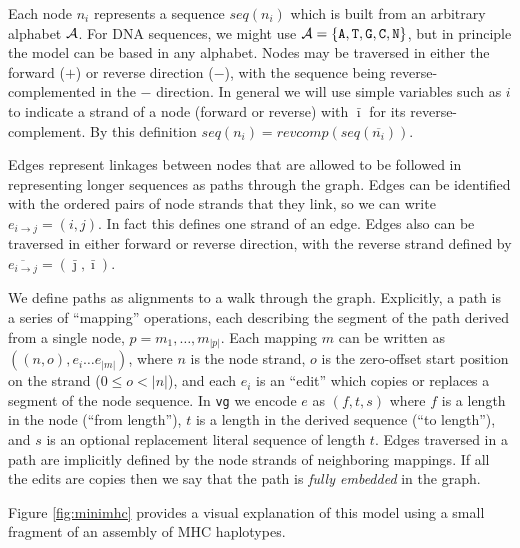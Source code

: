 \documentclass[12pt]{article}
\begin{document}
Each node $n_i$ represents a sequence $seq(n_i)$ which is built from an arbitrary alphabet ${ \cal A }$.
For DNA sequences, we might use ${ \cal A } = \{ {\tt A, T, G, C, N} \}$, but in principle the model can be based in any alphabet.
Nodes may be traversed in either the forward ($+$) or reverse direction ($-$), with the sequence being reverse-complemented in the
$-$ direction.  In general we will use simple variables such as $i$ to indicate a strand of a node (forward or reverse) with $\bar \imath$
for its reverse-complement. By this definition $seq(n_i) = revcomp(seq(\overline{n_i}))$.

Edges represent linkages between nodes that are allowed to be followed in representing longer sequences as paths through the graph.
Edges can be identified with the ordered pairs of node strands that they link, so we can write
$e_{i \rightarrow j} = ( i, j ) $.  In fact this defines one strand of an edge.  Edges also can be traversed in either forward or
reverse direction, with the reverse strand defined by $\overline{e_{i \rightarrow j}} = (  {\bar \jmath}, {\bar \imath} )$.

We define paths as alignments to a walk through the graph.  Explicitly, a path is a series of ``mapping'' operations, each
describing the segment of the path derived from a single node, $p = m_1, \ldots, m_{|p|}$.  Each mapping $m$ can be written
as $( (n, o), e_i \ldots e_{|m|} )$, where $n$ is the node strand, $o$ is the zero-offset start position on the strand ($0 \le o < |n|$),
and each $e_i$ is an ``edit'' which copies or replaces a segment of the node sequence.  In {\tt vg} we encode $e$ as $(f, t, s)$
where $f$ is a length in the node (``from length''), $t$ is a length in the derived sequence (``to length''), and $s$ is an optional
replacement literal sequence of length $t$.  Edges traversed in a path are implicitly defined by the node strands of neighboring mappings.
If all the edits are copies then we say that the path is {\em fully embedded} in the graph.

Figure \ref{fig:minimhc} provides a visual explanation of this model using a small fragment of an assembly of MHC haplotypes.
\end{document}
